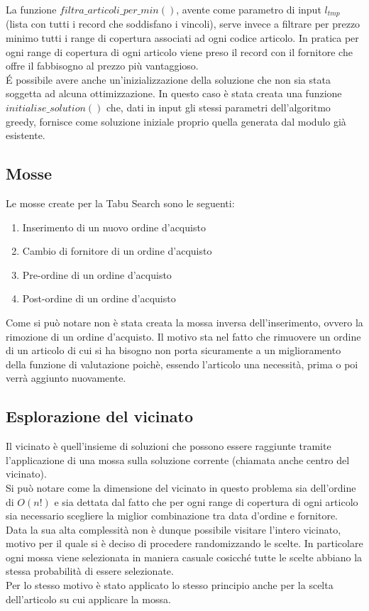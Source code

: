 \noindent La funzione $filtra\_articoli\_per\_min()$, avente come parametro di input $l_{tmp}$ (lista con tutti i record che soddisfano i vincoli),
serve invece a filtrare per prezzo minimo tutti i range di copertura associati ad ogni codice articolo.
In pratica per ogni range di copertura di ogni articolo viene preso il record con il fornitore che offre il fabbisogno al prezzo più vantaggioso.\\

\noindent É possibile avere anche un'inizializzazione della soluzione che non sia stata soggetta ad alcuna ottimizzazione.
In questo caso è stata creata una funzione $initialise\_solution()$ che, dati in input gli stessi parametri dell'algoritmo greedy, fornisce
come soluzione iniziale proprio quella generata dal modulo già esistente. 

\subsection{Mosse}
\label{sec:mosse}
\noindent Le mosse create per la Tabu Search sono le seguenti:
\begin{enumerate}
    \item Inserimento di un nuovo ordine d'acquisto
    \item Cambio di fornitore di un ordine d'acquisto
    \item Pre-ordine di un ordine d'acquisto
    \item Post-ordine di un ordine d'acquisto
\end{enumerate}
Come si può notare non è stata creata la mossa inversa dell'inserimento, ovvero la rimozione di un ordine d'acquisto.
Il motivo sta nel fatto che rimuovere un ordine di un articolo di cui si ha bisogno non porta sicuramente a un miglioramento
della funzione di valutazione poichè, essendo l'articolo una necessità, prima o poi verrà aggiunto nuovamente.

\subsection{Esplorazione del vicinato}
\label{sec:esplorazione-vicinato}
\noindent Il vicinato è quell'insieme di soluzioni che possono essere raggiunte
tramite l'applicazione di una mossa sulla soluzione corrente (chiamata anche centro del vicinato).\\
Si può notare come la dimensione del vicinato in questo problema sia dell'ordine di $O(n!)$ e sia dettata dal fatto che
per ogni range di copertura di ogni articolo sia necessario scegliere la miglior
combinazione tra data d'ordine e fornitore.\\
Data la sua alta complessità non è dunque possibile visitare l'intero vicinato,
motivo per il quale si è deciso di procedere randomizzando le scelte.
In particolare ogni mossa viene selezionata in maniera casuale cosicché tutte le scelte
abbiano la stessa probabilità di essere selezionate.\\
Per lo stesso motivo è stato applicato lo stesso principio anche per la scelta dell'articolo su cui applicare
la mossa.

